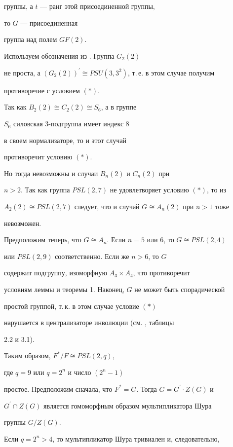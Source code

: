 группы, а $t$ --- ранг этой присоединенной группы,


то $G$ --- присоединенная


группа над полем $GF(2)$. 


Используем обозначения из \cite{cart}. Группа $G_2(2)$


не проста, а $(G_2(2))^\prime\cong PSU(3,3^2)$, т.\,е. в этом случае получим


противоречие с условием $(\ast)$.


Так как $B_2(2)\cong C_2(2)\cong S_6$, а в группе


$S_6$ силовская 3-подгруппа имеет индекс 8


в своем нормализаторе, то и этот случай


противоречит условию $(\ast)$.


Но тогда невозможны и случаи $B_n(2)$ и $C_n(2)$ при


$n>2$. Так как группа $PSL(2,7)$ не удовлетворяет условию $(\ast)$, то из


$A_2(2)\cong PSL(2,7)$ следует, что и случай $G\cong A_n(2)$ при $n>1$ тоже


невозможен.





Предположим теперь, что $G\cong A_n$. Если $n=5$ или 6, то $G\cong PSL(2,4)$


или $PSL(2,9)$ соответственно. Если же $n>6$, то $G$ 


содержит подгруппу, изоморфную $A_3\times A_4$, что противоречит


условиям леммы и теоремы 1. Наконец, $G$ не может быть спорадической 


простой группой, т.\,к. в этом случае условие $(\ast)$ 


нарушается в централизаторе инволюции (см. \cite{gor}, таблицы


2.2 и 3.1).





Таким образом, $F^*/F\cong PSL(2,q)$, 


где $q=9$ или $q=2^n$ и число $(2^n-1)$


простое. Предположим сначала, что $F^*=G$. Тогда $G=G^{\prime}\cdot Z(G)$ и


$G^{\prime}\cap Z(G)$ является гомоморфным образом мультипликатора Шура


группы $G/Z(G)$. 


Если $q=2^n>4$, то мультипликатор Шура тривиален и, следовательно,


